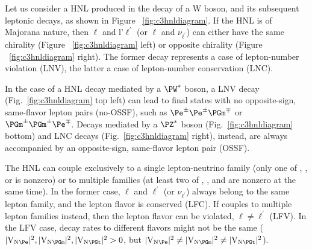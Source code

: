 


Let us consider a HNL produced in the decay of a W boson, and its subsequent leptonic decays, as shown in Figure ~\ref{fig:c3hnldiagram}. If the HNL is of Majorana nature, then $\ell$ and l'$\ell^\prime$ (or $\ell$
and $\nu_{\ell^\prime}$) can either have the same chirality (Figure ~\ref{fig:c3hnldiagram} left) or opposite chirality (Figure ~\ref{fig:c3hnldiagram} right). The former decay represents a case of lepton-number violation (LNV), the latter a case of lepton-number conservation (LNC).

In the case of a HNL decay mediated by a $\PW^\ast$ boson, a LNV decay
(Fig.~\ref{fig:c3hnldiagram} top left)
can lead to final states with no opposite-sign, same-flavor lepton
pairs (no-OSSF), such as $\Pe^\pm\Pe^\pm\PGm^\mp$ or
$\PGm^\pm\PGm^\pm\Pe^\mp$.
Decays mediated by a $\PZ^\ast$ boson (Fig.~\ref{fig:c3hnldiagram}
bottom) and LNC decays (Fig.~\ref{fig:c3hnldiagram} right), instead, are
always accompanied by an opposite-sign, same-flavor lepton pair
(OSSF).

The HNL can couple exclusively to a single lepton-neutrino family
(\ie only one of \mixpare, \mixparm, or \mixpart is nonzero)
or to multiple families (\ie at least two of \mixpare, \mixparm,
and \mixpart are nonzero at the same time).
In the former case, $\ell$ and $\ell^\prime$ (or
$\nu_{\ell^{\prime}}$) always belong to the same lepton family,
and the lepton flavor is conserved (LFC).
If \hnl couples to multiple lepton families instead, then the
lepton flavor can be violated, $\ell\neq\ell^\prime$ (LFV).
In the LFV case, decay rates to different flavors might not be the
same ($\mixpare,\mixparm,\mixpart>0$, but
$\mixpare\neq\mixparm\neq\mixpart$).

